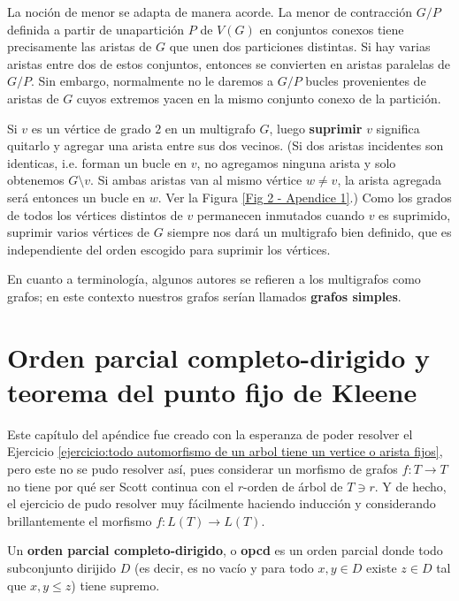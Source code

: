 \documentclass[../main.tex]{subfiles}
\begin{document}
  La noción de menor se adapta de manera acorde. La menor de contracción $G/P$ definida a partir de unapartición $P$
  de $V(G)$ en conjuntos conexos tiene precisamente las aristas de $G$ que unen dos particiones distintas. Si hay
  varias aristas entre dos de estos conjuntos, entonces se convierten en aristas paralelas de $G/P$. Sin embargo,
  normalmente no le daremos a $G/P$ bucles provenientes de aristas de $G$ cuyos extremos yacen en la mismo conjunto
  conexo de la partición.

  Si $v$ es un vértice de grado $2$ en un multigrafo $G$, luego \textbf{suprimir} $v$ significa quitarlo y agregar
  una arista entre sus dos vecinos. (Si dos aristas incidentes son identicas, i.e. forman un bucle en $v$, no
  agregamos ninguna arista y solo obtenemos $G \setminus v$. Si ambas aristas van al mismo vértice $w \neq v$, la
  arista agregada será entonces un bucle en $w$. Ver la Figura \ref{Fig 2 - Apendice 1}.) Como los grados de todos los vértices
  distintos de $v$ permanecen inmutados cuando $v$ es suprimido, suprimir varios vértices de $G$ siempre nos dará un
  multigrafo bien definido, que es independiente del orden escogido para suprimir los vértices.

  En cuanto a terminología, algunos autores se refieren a los multigrafos como grafos; en este contexto nuestros
  grafos serían llamados \textbf{grafos simples}.







\chapter{Orden parcial completo-dirigido y teorema del punto fijo de Kleene}\label{apendice:orden parcial completo
-dirigido y teorema del punto fijo de Kleene}

Este capítulo del apéndice fue creado con la esperanza de poder resolver el Ejercicio \ref{ejercicio:todo automorfismo de un arbol tiene un vertice o arista fijos}, pero este no se pudo resolver así, pues considerar
 un morfismo de grafos $f : T \rightarrow T$ no tiene por qué ser Scott continua con el $r$-orden de árbol de $
 T \ni r$. Y de hecho, el ejercicio de pudo resolver muy fácilmente haciendo inducción y considerando
 brillantemente el morfismo $f : L(T) \rightarrow L(T)$.

\begin{definition}
    Un \textbf{orden parcial completo-dirigido}, o \textbf{opcd} es un orden parcial donde todo subconjunto
    dirijido $D$ (es
    decir, es no vacío y para todo $x,y \in D$ existe $z \in D$ tal que $x,y \leq z$) tiene supremo.
\end{definition}
\end{document}
